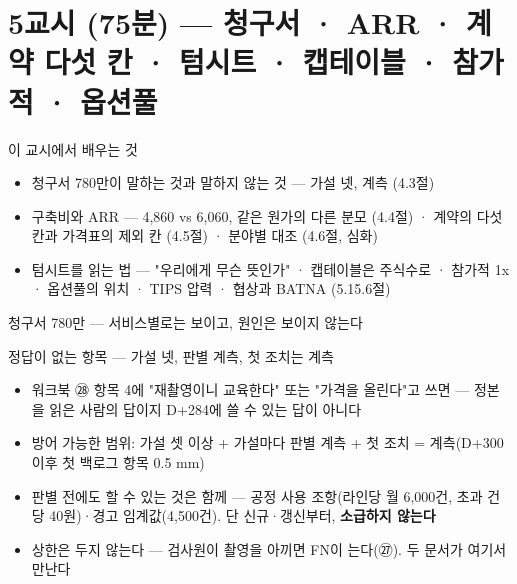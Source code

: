 \section{5교시 (75분) — 청구서 · ARR · 계약 다섯 칸 · 텀시트 · 캡테이블 · 참가적 · 옵션풀}
\begin{frame}{이 교시에서 배우는 것}
\begin{itemize}
\item 청구서 780만이 말하는 것과 말하지 않는 것 — 가설 넷, 계측 (4.3절)
\item 구축비와 ARR — 4,860 vs 6,060, 같은 원가의 다른 분모 (4.4절) · 계약의 다섯 칸과 가격표의 제외 칸 (4.5절) · 분야별 대조 (4.6절, 심화)
\item 텀시트를 읽는 법 — "우리에게 무슨 뜻인가" · 캡테이블은 주식수로 · 참가적 1x · 옵션풀의 위치 · TIPS 압력 · 협상과 BATNA (5.1\til{}5.6절)
\end{itemize}
\end{frame}

\begin{frame}{청구서 780만 — 서비스별로는 보이고, 원인은 보이지 않는다}
\end{frame}

\begin{frame}{정답이 없는 항목 — 가설 넷, 판별 계측, 첫 조치는 계측}
\begin{itemize}
\item 워크북 ㉘ 항목 4에 "재촬영이니 교육한다" 또는 "가격을 올린다"고 쓰면 — 정본을 읽은 사람의 답이지 D+284에 쓸 수 있는 답이 아니다
\item 방어 가능한 범위: 가설 셋 이상 + 가설마다 판별 계측 + 첫 조치 = 계측(D+300 이후 첫 백로그 항목 0.5 mm)
\item 판별 전에도 할 수 있는 것은 함께 — 공정 사용 조항(라인당 월 6,000건, 초과 건당 40원)·경고 임계값(4,500건). 단 신규·갱신부터, \textbf{소급하지 않는다}
\item 상한은 두지 않는다 — 검사원이 촬영을 아끼면 FN이 는다(㉗). 두 문서가 여기서 만난다
\end{itemize}
\end{frame}

